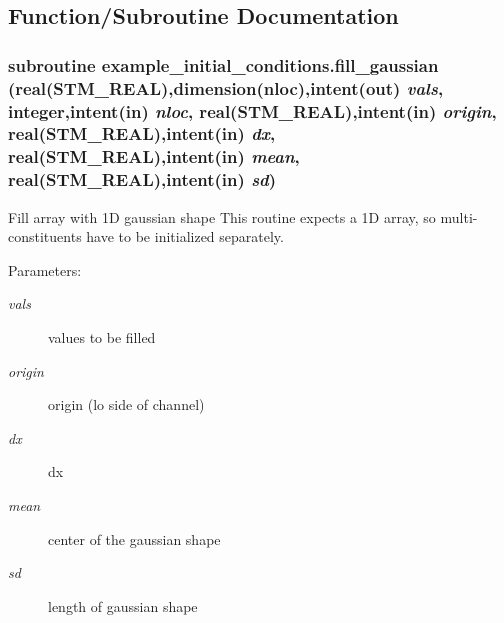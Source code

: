 \subsection{Function/Subroutine Documentation}
\hypertarget{a00030_2c47dd5d0ce7fcef026d458d648d555a}{
\subsubsection[{fill\_\-gaussian}]{\setlength{\rightskip}{0pt plus 5cm}subroutine example\_\-initial\_\-conditions.fill\_\-gaussian (real(STM\_\-REAL),dimension(nloc),intent(out) {\em vals}, \/  integer,intent(in) {\em nloc}, \/  real(STM\_\-REAL),intent(in) {\em origin}, \/  real(STM\_\-REAL),intent(in) {\em dx}, \/  real(STM\_\-REAL),intent(in) {\em mean}, \/  real(STM\_\-REAL),intent(in) {\em sd})}}
\label{a00030_2c47dd5d0ce7fcef026d458d648d555a}


Fill array with 1D gaussian shape This routine expects a 1D array, so multi-constituents have to be initialized separately. 

\begin{Desc}
\item[Parameters:]
\begin{description}
\item[{\em vals}]values to be filled\item[{\em origin}]origin (lo side of channel)\item[{\em dx}]dx\item[{\em mean}]center of the gaussian shape\item[{\em sd}]length of gaussian shape \end{description}
\end{Desc}
